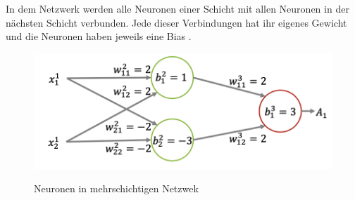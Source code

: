 In dem Netzwerk werden alle Neuronen einer Schicht mit allen Neuronen in der nächsten Schicht verbunden.  Jede dieser Verbindungen hat ihr eigenes Gewicht und die Neuronen haben jeweils eine Bias \cite{Matzka_2021}.
\begin{figure}[h]
\centering
\includegraphics[scale=0.8]{pic/NeuronFormel}
\caption{ Neuronen in mehrschichtigen Netzwek}\cite{Matzka_2021}
\end{figure}\\
